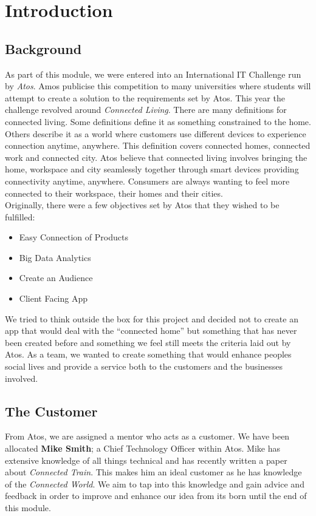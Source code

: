\section{Introduction}

\subsection{Background}
As part of this module, we were entered into an International IT Challenge run by \emph{Atos}.  Amos publicise this competition to many universities where students will attempt to create a solution to the requirements set by Atos.  This year the challenge revolved around \emph{Connected Living}.  There are many definitions for connected living.  Some definitions define it as something constrained to the home.  Others describe it as a world where customers use different devices to experience connection anytime, anywhere.  This definition covers connected homes, connected work and connected city.  Atos believe that connected living involves bringing the home, workspace and city seamlessly together through smart devices providing connectivity anytime, anywhere.  Consumers are always wanting to feel more connected to their workspace, their homes and their cities.  \\
Originally, there were a few objectives set by Atos that they wished to be fulfilled:
\begin{itemize}
\item Easy Connection of Products
\item Big Data Analytics
\item Create an Audience
\item Client Facing App
\end{itemize}
We tried to think outside the box for this project and decided not to create an app that would deal with the ``connected home'' but something that has never been created before and something we feel still meets the criteria laid out by Atos.  As a team, we wanted to create something that would enhance peoples social lives and provide a service both to the customers and the businesses involved.  

\subsection{The Customer}
From Atos, we are assigned a mentor who acts as a customer.  We have been allocated \textbf{Mike Smith}; a Chief Technology Officer within Atos.  Mike has extensive knowledge of all things technical and has recently written a paper about \emph{Connected Train}.  This makes him an ideal customer as he has knowledge of the \emph{Connected World}.  We aim to tap into this knowledge and gain advice and feedback in order to improve and enhance our idea from its born until the end of this module.  

